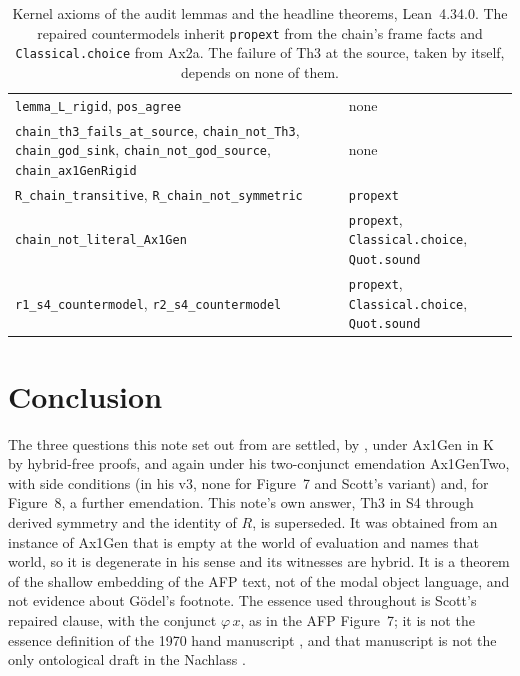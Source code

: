 \documentclass[11pt,a4paper]{article}
\newcommand{\lean}[1]{\texttt{#1}}
\theoremstyle{definition}
\theoremstyle{remark}
\begin{document}
\begin{table}[t]
\begin{tabular}{@{}>{\raggedright\arraybackslash}p{}>{\raggedright\arraybackslash}p{}@{}}
  \lean{lemma\_L\_rigid}, \lean{pos\_agree} &
  none \\
\lean{chain\_th3\_fails\_at\_source}, \lean{chain\_not\_Th3},
  \lean{chain\_god\_sink}, \lean{chain\_not\_god\_source},
  \lean{chain\_ax1GenRigid} &
  none \\
\lean{R\_chain\_transitive}, \lean{R\_chain\_not\_symmetric} &
  \lean{propext} \\
\lean{chain\_not\_literal\_Ax1Gen} &
  \lean{propext}, \lean{Classical.choice}, \lean{Quot.sound} \\
\lean{r1\_s4\_countermodel}, \lean{r2\_s4\_countermodel} &
  \lean{propext}, \lean{Classical.choice}, \lean{Quot.sound} \\
\bottomrule
\end{tabular}
\caption{Kernel axioms of the audit lemmas and the headline theorems,
Lean~4.34.0.
The repaired countermodels inherit \lean{propext} from the chain's frame
facts and \lean{Classical.choice} from Ax2a.
The failure of Th3 at the source, taken by itself, depends on none of them.}
\label{tab:axioms}
\end{table}

\section{Conclusion}

The three questions this note set out from are settled, by
\cite{benzmuellerPWN2026}, under Ax1Gen in K by hybrid-free proofs, and
again under his two-conjunct emendation Ax1GenTwo, with side conditions (in
his v3, none for Figure~7 and Scott's variant) and, for Figure~8, a further
emendation.
This note's own answer, Th3 in S4 through derived symmetry and the identity
of \(R\), is superseded.
It was obtained from an instance of Ax1Gen that is empty at the world of
evaluation and names that world, so it is degenerate in his sense and its
witnesses are hybrid.
It is a theorem of the shallow embedding of the AFP text, not of the modal
object language, and not evidence about G\"odel's footnote.
The essence used throughout is Scott's repaired clause, with the conjunct
\(\varphi\,x\), as in the AFP Figure~7; it is not the essence definition of
the 1970 hand manuscript \cite{benzmuellerScott2025}, and that manuscript
is not the only ontological draft in the Nachlass \cite{lethen2025}.
\end{document}
